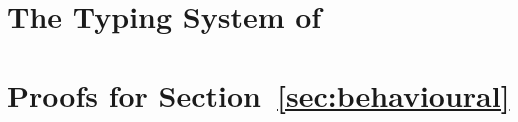 \documentclass[smallcondensed]{svjour3}
\begin{document}
\newpage
\appendix 
%

\section{The Typing System of \HOp}
\label{app:types}


\section{Proofs for Section~\ref{sec:behavioural}}
\label{app:beh}



\end{document}
